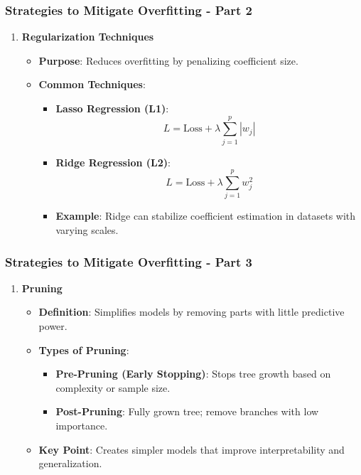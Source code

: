 \documentclass[aspectratio=169]{beamer}
\begin{document}
\begin{frame}[fragile]
    \frametitle{Strategies to Mitigate Overfitting - Part 2}
    \begin{enumerate}[resume]
        \item \textbf{Regularization Techniques}
            \begin{itemize}
                \item \textbf{Purpose}: Reduces overfitting by penalizing coefficient size.
                \item \textbf{Common Techniques}:
                    \begin{itemize}
                        \item \textbf{Lasso Regression (L1)}: 
                            \[ 
                            L = \text{Loss} + \lambda \sum_{j=1}^{p} |w_j| 
                            \]
                        \item \textbf{Ridge Regression (L2)}: 
                            \[ 
                            L = \text{Loss} + \lambda \sum_{j=1}^{p} w_j^2 
                            \]
                        \item \textbf{Example}: Ridge can stabilize coefficient estimation in datasets with varying scales.
                    \end{itemize}
            \end{itemize}
    \end{enumerate}
\end{frame}

\begin{frame}[fragile]
    \frametitle{Strategies to Mitigate Overfitting - Part 3}
    \begin{enumerate}[resume]
        \item \textbf{Pruning}
            \begin{itemize}
                \item \textbf{Definition}: Simplifies models by removing parts with little predictive power.
                \item \textbf{Types of Pruning}:
                    \begin{itemize}
                        \item \textbf{Pre-Pruning (Early Stopping)}: Stops tree growth based on complexity or sample size.
                        \item \textbf{Post-Pruning}: Fully grown tree; remove branches with low importance.
                    \end{itemize}
                \item \textbf{Key Point}: Creates simpler models that improve interpretability and generalization.
            \end{itemize}
    \end{enumerate}
\end{frame}
\end{document}
